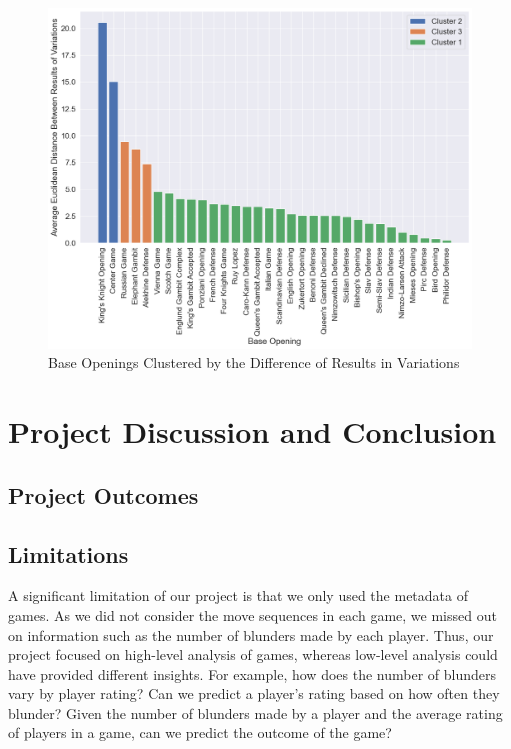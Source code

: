 \documentclass[a4paper, 11pt]{article}
\begin{document}
\begin{figure}[H]
    \centering
    \caption{Base Openings Clustered by the Difference of Results in Variations}
    \label{fig:baseOpeningsClusteredByDifferenceOfResultsInVariations}
    \includegraphics[width=\textwidth]{Base Openings Clustered by Difference in Variations.png}
\end{figure}

\section{Project Discussion and Conclusion}

\subsection{Project Outcomes}

\subsection{Limitations}
A significant limitation of our project is that we only used the metadata of games. As we did not consider the move sequences in each game, we missed out on information such as the number of blunders made by each player. Thus, our project focused on high-level analysis of games, whereas low-level analysis could have provided different insights. For example, how does the number of blunders vary by player rating? Can we predict a player's rating based on how often they blunder? Given the number of blunders made by a player and the average rating of players in a game, can we predict the outcome of the game?
\end{document}
